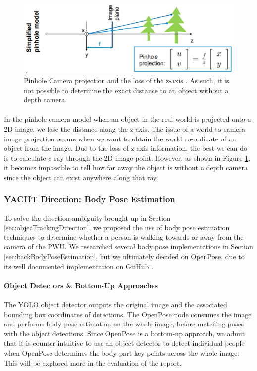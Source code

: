 \begin{figure}[ht]
    \centering
    \includegraphics[width=0.8\linewidth]{img/chapter4_analysis/pinholecamera.png}
    \caption{Pinhole Camera projection and the loss of the z-axis \cite{Leutenegger2019}. As such, it is not possible to determine the exact distance to an object without a depth camera.}
    \label{fig:pinhole}
    \vspace{-1\baselineskip}
\end{figure}

\paragraph{} In the pinhole camera model when an object in the real world is projected onto a 2D image, we lose the distance along the z-axis. The issue of a world-to-camera image projection occurs when we want to obtain the world co-ordinate of an object from the image. Due to the loss of z-axis information, the best we can do is to calculate a ray through the 2D image point. However, as shown in Figure \ref{fig:pinhole}, it becomes impossible to tell how far away the object is without a depth camera since the object can exist anywhere along that ray.

\subsubsection{YACHT Direction: Body Pose Estimation} \label{des:YACHTBody}
To solve the direction ambiguity brought up in Section \ref{sec:objecTrackingDirection}, we proposed the use of body pose estimation techniques to determine whether a person is walking towards or away from the camera of the PWU. We researched several body pose implementations in Section \ref{sec:backBodyPoseEstimation}, but we ultimately decided on OpenPose, due to its well documented implementation on GitHub \cite{Cao2017}.

\paragraph{Object Detectors \& Bottom-Up Approaches} The YOLO object detector outputs the original image and the associated bounding box coordinates of detections. The OpenPose node consumes the image and performs body pose estimation on the whole image, before matching poses with the object detections. Since OpenPose is a bottom-up approach, we admit that it is counter-intuitive to use an object detector to detect individual people when OpenPose determines the body part key-points across the whole image. This will be explored more in the evaluation of the report.

